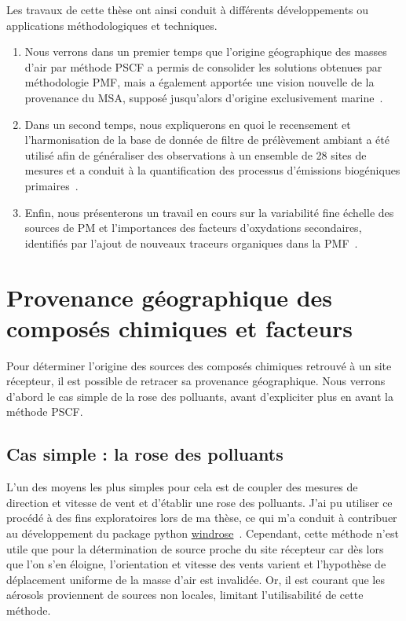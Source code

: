Les travaux de cette thèse ont ainsi conduit à différents développements ou applications
méthodologiques et techniques.
\begin{enumerate}
    \item Nous verrons dans un premier temps que l'origine géographique des masses d'air
        par méthode PSCF a permis de consolider les solutions obtenues par méthodologie
        PMF, mais a également apportée une vision nouvelle de la provenance du MSA,
        supposé jusqu'alors d'origine exclusivement marine~\autocite{gollyOrganic2019}.
    \item Dans un second temps, nous expliquerons en quoi le recensement et
        l'harmonisation de la base de donnée de filtre de prélèvement ambiant a été
        utilisé afin de généraliser des observations à un ensemble de 28 sites de
        mesures et a conduit à la quantification des processus d'émissions biogéniques
        primaires~\autocite{samakePolyols2019,samakeArabitol2019}.
    \item Enfin, nous présenterons un travail en cours sur la variabilité fine échelle
        des sources de PM et l'importances des facteurs d'oxydations secondaires,
        identifiés par l'ajout de nouveaux traceurs organiques dans la
        PMF~\autocite{borlazaSourceinprep}.
\end{enumerate}


\section{Provenance géographique des composés chimiques et facteurs}%
\label{sec:provenance_géographique_des_composés_chimiques_et_facteurs}

Pour déterminer l'origine des sources des composés chimiques retrouvé à un site récepteur,
il est possible de retracer sa provenance géographique. Nous verrons d'abord le cas simple
de la rose des polluants, avant d'expliciter plus en avant la méthode PSCF.

\subsection{Cas simple : la rose des polluants}%
\label{sub:cas_simple_la_rose_des_polluants}

L'un des moyens les plus simples pour cela est de coupler des mesures de direction et
vitesse de vent et d'établir une rose des polluants. J'ai pu utiliser ce procédé à des
fins exploratoires lors de ma thèse, ce qui m'a conduit à contribuer au développement du
package python
\href{https://github.com/python-windrose/windrose/}{windrose}~\autocite{scls19frPythonwindrose2019}.
Cependant, cette méthode n'est utile que pour la détermination de source proche du site
récepteur car dès lors que l'on s'en éloigne, l'orientation et vitesse des vents varient
et l'hypothèse de déplacement uniforme de la masse d'air est invalidée.  Or, il est
courant que les aérosols proviennent de sources non locales, limitant l'utilisabilité de
cette méthode.

